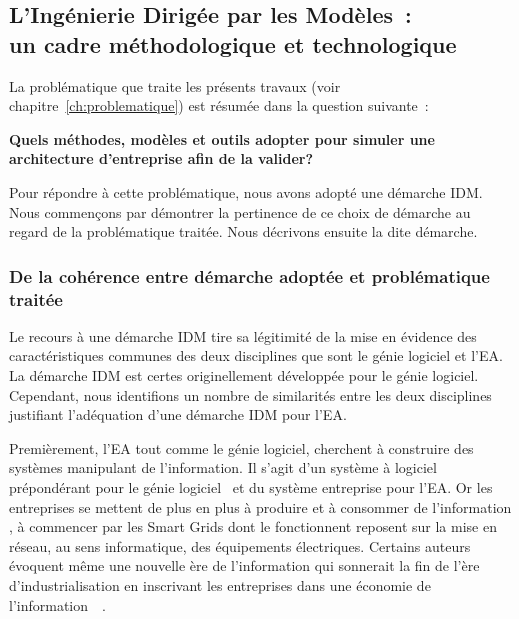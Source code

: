 \subsection{L'Ingénierie Dirigée par les Modèles~:\\ un cadre méthodologique et technologique}

    La problématique que traite les présents travaux (voir
    chapitre~\ref{ch:problematique}) est résumée dans la question suivante~:

    {\bfseries Quels méthodes, modèles et outils adopter pour simuler une architecture d'entreprise afin de la valider?}

    Pour répondre à cette problématique, nous avons adopté une démarche IDM.
    Nous commençons par démontrer la pertinence de ce choix de démarche
    au regard de la problématique traitée.  Nous décrivons ensuite la dite démarche.

            \subsubsection{De la cohérence entre démarche adoptée et
    problématique traitée}

    Le recours à une démarche IDM tire sa légitimité de la mise en
    évidence des caractéristiques communes des deux disciplines que
    sont le génie logiciel et l'EA. La démarche IDM est certes originellement développée
    pour le génie logiciel. Cependant, nous identifions un nombre de similarités
    entre les deux disciplines justifiant l'adéquation d'une démarche IDM pour l'EA.

    Premièrement, l'EA tout comme le génie logiciel, cherchent à construire
    des systèmes manipulant de l'information. Il s'agit d'un système à
    logiciel prépondérant pour le génie
    logiciel~\cite{jezequel2012ingenierie} et du système entreprise pour l'EA.
    Or les entreprises se mettent de plus en plus à produire et à
    consommer de l'information \cite{zachman1997enterprise}, à
    commencer par les Smart Grids dont le fonctionnent reposent sur la
    mise en réseau, au sens informatique, des équipements électriques. Certains auteurs
    évoquent même une nouvelle ère de l'information qui sonnerait
    la fin de l'ère d'industrialisation en inscrivant les entreprises dans une économie
    de l'information~\cite{toffler1981third}~\cite{webster2014theories}.

